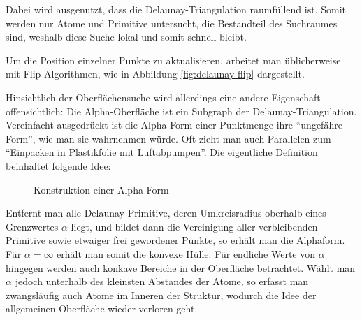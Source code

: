
Dabei wird ausgenutzt, dass die Delaunay-Triangulation raumfüllend ist.
Somit werden nur Atome und Primitive untersucht, die Bestandteil des Suchraumes sind, weshalb diese Suche lokal und somit schnell bleibt.

Um die Position einzelner Punkte zu aktualisieren, arbeitet man üblicherweise mit Flip-Algorithmen, wie in Abbildung \ref{fig:delaunay-flip} dargestellt.

Hinsichtlich der Oberflächensuche wird allerdings eine andere Eigenschaft offensichtlich:
Die Alpha-Oberfläche ist ein Subgraph der Delaunay-Triangulation.
Vereinfacht ausgedrückt ist die Alpha-Form einer Punktmenge ihre ``ungefähre Form'', wie man sie wahrnehmen würde.
Oft zieht man auch Parallelen zum ``Einpacken in Plastikfolie mit Luftabpumpen''.
Die eigentliche Definition beinhaltet folgende Idee:

\begin{figure}[bhpt]
  \centering
  \caption{Konstruktion einer Alpha-Form}
  \label{fig:delaunay-alpha}
\end{figure}

Entfernt man alle Delaunay-Primitive, deren Umkreisradius oberhalb eines Grenzwertes $\alpha$ liegt, und bildet dann die Vereinigung aller verbleibenden Primitive sowie etwaiger frei gewordener Punkte, so erhält man die Alphaform.
Für $\alpha = \infty$ erhält man somit die konvexe Hülle.
Für endliche Werte von $\alpha$ hingegen werden auch konkave Bereiche in der Oberfläche betrachtet.
Wählt man $\alpha$ jedoch unterhalb des kleinsten Abstandes der Atome, so erfasst man zwangsläufig auch Atome im Inneren der Struktur, wodurch die Idee der allgemeinen Oberfläche wieder verloren geht.

